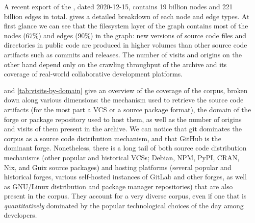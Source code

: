 A recent export of the \SWHGD{}, dated 2020-12-15, contains 19 billion nodes
and 221 billion edges in total.
 gives a detailed breakdown of each node and edge
types. At first glance we can see that the filesystem layer of the graph
contains most of the nodes (67\%) and edges (90\%) in the graph: new versions
of source code files and directories in public code are produced in higher
volumes than other source code artifacts such as commits and releases. The
number of visits and origins on the other hand depend only on the crawling
throughput of the \SWH{} archive and its coverage of real-world collaborative
development platforms.

 and \cref{tab:visits-by-domain} give an overview
of the coverage of the corpus, broken down along various dimensions:
the mechanism used to retrieve the source code artifacts (for the most part a
VCS or a source package format), the domain of the forge or package repository
used to host them, as well as the number of origins and visits of them present
in the archive.  We can notice that git dominates the corpus as a source code
distribution mechanism, and that GitHub is the dominant forge.  Nonetheless,
there is a long tail of both source code distribution mechanisms (other popular
and historical VCSs; Debian, NPM, PyPI, CRAN, Nix, and Guix source packages)
and hosting platforms (several popular and historical forges, various
self-hosted instances of GitLab and other forges, as well as GNU/Linux
distribution and package manager repositories) that are also present in the
corpus. They account for a very diverse corpus, even if one that is
\emph{quantitatively} dominated by the popular technological choices of the day
among developers.

